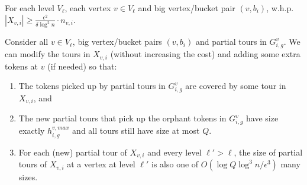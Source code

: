 \documentclass[twoside,leqno]{article}
\newcommand{\calT}{{\cal T}}
\newcommand{\eps}{\epsilon}
\begin{document}
\vspace{-1.5mm}
\begin{lemma}\label{lem:extra}
For each level $V_\ell$, each vertex $v\in V_\ell$ and big vertex/bucket pair $(v,b_i)$,
w.h.p. $|X_{v,i}|\geq \frac{\eps^2}{\delta\log^2 n}\cdot n_{v,i}$.
\vspace{-3.5mm}
\end{lemma}
\begin{lemma}\label{lem:extra2}
Consider all $v\in V_\ell$, big vertex/bucket pairs $(v,b_i)$ and partial tours in $G^v_{i,g}$.
We can modify the tours in $X_{v,i}$ (without increasing the cost) and adding some extra tokens at $v$ (if needed) so that:
\begin{enumerate}
\item The tokens picked up by partial tours in $G^v_{i,g}$ are covered by some tour in $X_{v,i}$, and
\vspace{-1mm}
\item The new partial tours that pick up the orphant tokens in $G^v_{i,g}$ 
have size exactly $h^{v,max}_{i,g}$ and all tours still have size at most $Q$.
\item For each (new) partial tour of $X_{v,i}$ and every level $\ell'>\ell$, the size of partial tours of $X_{v,i}$ at a
vertex at level $\ell'$ is also one of $O(\log Q\log^3 n/\eps^3)$ many sizes.
\end{enumerate}
\end{lemma}
\end{document}
